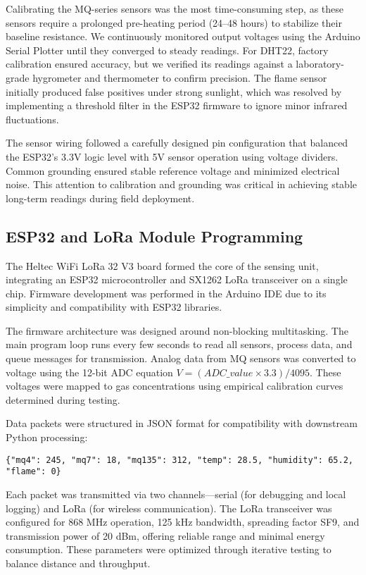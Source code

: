 Calibrating the MQ-series sensors was the most time-consuming step, as these sensors require a prolonged pre-heating period (24–48 hours) to stabilize their baseline resistance. We continuously monitored output voltages using the Arduino Serial Plotter until they converged to steady readings. For DHT22, factory calibration ensured accuracy, but we verified its readings against a laboratory-grade hygrometer and thermometer to confirm precision. The flame sensor initially produced false positives under strong sunlight, which was resolved by implementing a threshold filter in the ESP32 firmware to ignore minor infrared fluctuations.

The sensor wiring followed a carefully designed pin configuration that balanced the ESP32’s 3.3V logic level with 5V sensor operation using voltage dividers. Common grounding ensured stable reference voltage and minimized electrical noise. This attention to calibration and grounding was critical in achieving stable long-term readings during field deployment.

\subsection{ESP32 and LoRa Module Programming}
\label{subsec:esp32_programming}

The Heltec WiFi LoRa 32 V3 board formed the core of the sensing unit, integrating an ESP32 microcontroller and SX1262 LoRa transceiver on a single chip. Firmware development was performed in the Arduino IDE due to its simplicity and compatibility with ESP32 libraries.

The firmware architecture was designed around non-blocking multitasking. The main program loop runs every few seconds to read all sensors, process data, and queue messages for transmission. Analog data from MQ sensors was converted to voltage using the 12-bit ADC equation $V = (ADC\_value \times 3.3) / 4095$. These voltages were mapped to gas concentrations using empirical calibration curves determined during testing.

Data packets were structured in JSON format for compatibility with downstream Python processing:
\begin{verbatim}
{"mq4": 245, "mq7": 18, "mq135": 312, "temp": 28.5, "humidity": 65.2, "flame": 0}
\end{verbatim}

Each packet was transmitted via two channels—serial (for debugging and local logging) and LoRa (for wireless communication). The LoRa transceiver was configured for 868 MHz operation, 125 kHz bandwidth, spreading factor SF9, and transmission power of 20 dBm, offering reliable range and minimal energy consumption. These parameters were optimized through iterative testing to balance distance and throughput.

